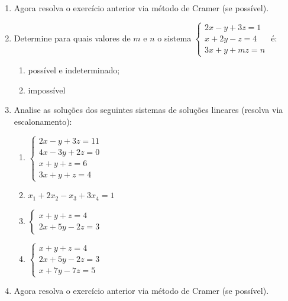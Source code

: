 \documentclass[oneside,a4paper,12pt]{article}
\begin{document}
\begin{enumerate}
	\item Agora resolva o exercício anterior via método de Cramer (se possível).
	
	\item Determine para quais valores de $m$ e $n$ o sistema $\begin{cases}
	2x - y + 3z = 1 \\
	x + 2y - z = 4  \\
	3x + y + mz = n
	\end{cases}
	$ é:
	\begin{enumerate}
		\item possível e indeterminado;
		\item impossível
	\end{enumerate}
	
	\item Analise as soluções dos seguintes sistemas de soluções lineares (resolva via escalonamento):
	\begin{multicols}{2}
	\begin{enumerate}
		\item $\begin{cases}
		2x - y + 3z = 11 \\
		4x - 3y + 2z = 0 \\
		x + y + z = 6 \\
		3x + y + z = 4
		\end{cases}$
		\item $x_1 + 2x_2 - x_3 + 3x_4 = 1$
		\item $\begin{cases}
		x+y+z = 4 \\
		2x +5y - 2z = 3
		\end{cases}$
		\item $\begin{cases}
		x + y+z = 4 \\
		2x + 5y - 2z = 3 \\
		x + 7y - 7z = 5
		\end{cases}$
	\end{enumerate}	
	\end{multicols}
	
	\item Agora resolva o exercício anterior via método de Cramer (se possível).
	

\end{enumerate}
\end{document}
